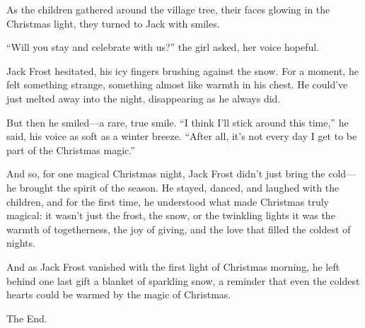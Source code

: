 \documentclass{article}
\begin{document}
As the children gathered around the village tree, their faces glowing in the Christmas light, they turned to Jack with smiles.

“Will you stay and celebrate with us?” the girl asked, her voice hopeful.

Jack Frost hesitated, his icy fingers brushing against the snow. For a moment, he felt something strange, something almost like warmth in his chest. He could’ve just melted away into the night, disappearing as he always did.

But then he smiled—a rare, true smile. “I think I’ll stick around this time,” he said, his voice as soft as a winter breeze. “After all, it’s not every day I get to be part of the Christmas magic.”

And so, for one magical Christmas night, Jack Frost didn’t just bring the cold—he brought the spirit of the season. He stayed, danced, and laughed with the children, and for the first time, he understood what made Christmas truly magical: it wasn’t just the frost, the snow, or the twinkling lights it was the warmth of togetherness, the joy of giving, and the love that filled the coldest of nights.

And as Jack Frost vanished with the first light of Christmas morning, he left behind one last gift a blanket of sparkling snow, a reminder that even the coldest hearts could be warmed by the magic of Christmas.

The End.
\end{document}
